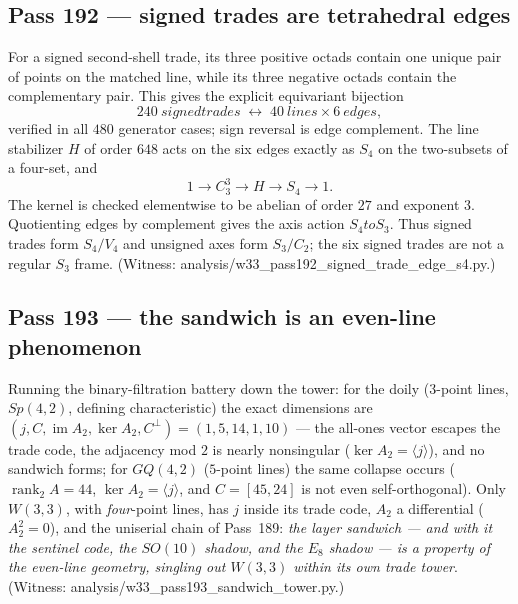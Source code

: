 \documentclass[12pt,a4paper]{article}
\def\mathrm#1{#1}%
\def\mathbf#1{#1}%
\def\texttt#1{#1}%
\def\text#1{#1}%
\def\to{ to }%
\theoremstyle{definition}
\newcommand{\GQ}{\mathrm{GQ}}
\begin{document}
\subsection{Pass 192 --- signed trades are tetrahedral edges}
\label{ssec:pass192}

For a signed second-shell trade, its three positive octads contain one
unique pair of points on the matched line, while its three negative
octads contain the complementary pair.  This gives the explicit
equivariant bijection
\[
  \boxed{240\ \text{signed trades}
  \;\longleftrightarrow\;40\ \text{lines}\times6\ \text{edges}},
\]
verified in all $480$ generator cases; sign reversal is edge complement.
The line stabilizer $H$ of order $648$ acts on the six edges exactly as
$S_4$ on the two-subsets of a four-set, and
\[
  \boxed{1\longrightarrow C_3^3\longrightarrow H
  \longrightarrow S_4\longrightarrow1}.
\]
The kernel is checked elementwise to be abelian of order $27$ and
exponent $3$.  Quotienting edges by complement gives the axis action
$S_4\to S_3$.  Thus signed trades form $S_4/V_4$ and unsigned axes form
$S_3/C_2$; the six signed trades are not a regular $S_3$ frame. (Witness:
\texttt{analysis/w33\_pass192\_signed\_trade\_edge\_s4.py}.)

\subsection{Pass 193 --- the sandwich is an even-line phenomenon}
\label{ssec:pass193}

Running the binary-filtration battery down the tower: for the doily
($3$-point lines, $\mathrm{Sp}(4,2)$, defining characteristic) the exact
dimensions are $(j,C,\operatorname{im}A_2,\ker A_2,C^\perp)=
(1,5,14,1,10)$ --- the all-ones vector escapes the trade code, the
adjacency mod $2$ is nearly nonsingular ($\ker A_2=\langle\mathbf
j\rangle$), and no sandwich forms; for $\GQ(4,2)$ ($5$-point lines) the
same collapse occurs ($\operatorname{rank}_2A=44$,
$\ker A_2=\langle\mathbf j\rangle$, and $C=[45,24]$ is not even
self-orthogonal). Only $W(3,3)$, with \emph{four}-point lines, has
$\mathbf j$ inside its trade code, $A_2$ a differential ($A_2^2=0$), and
the uniserial chain of Pass~189: \emph{the layer sandwich --- and with it
the sentinel code, the $\mathrm{SO}(10)$ shadow, and the $E_8$ shadow ---
is a property of the even-line geometry, singling out $W(3,3)$ within its
own trade tower}. (Witness:
\texttt{analysis/w33\_pass193\_sandwich\_tower.py}.)

\end{document}
